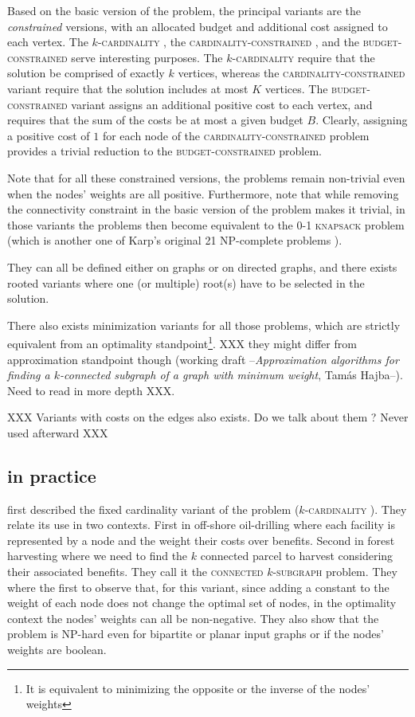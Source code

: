 	Based on the basic version of the \mwcs{} problem, the principal variants are the \emph{constrained} versions, with an allocated budget and additional cost assigned to each vertex.
	The \textsc{$k$-cardinality \mwcs{}}, the \textsc{cardinality-constrained \mwcs{}}, and the \textsc{budget-constrained \mwcs{}} serve interesting purposes.
	The \textsc{$k$-cardinality \mwcs{}} require that the solution be comprised of exactly $k$ vertices, whereas the \textsc{cardinality-constrained \mwcs{}} variant require that the solution includes at most $K$ vertices.
	The \textsc{budget-constrained \mwcs{}} variant assigns an additional positive cost to each vertex, and requires that the sum of the costs be at most a given budget $B$.
	Clearly, assigning a positive cost of $1$ for each node of the \textsc{cardinality-constrained \mwcs{}} problem provides a trivial reduction to the \textsc{budget-constrained \mwcs{}} problem.

	Note that for all these constrained versions, the problems remain non-trivial even when the nodes' weights are all positive.
	Furthermore, note that while removing the connectivity constraint in the basic version of the problem makes it trivial, in those variants the problems then become equivalent to the \textsc{0-1 knapsack} problem (which is another one of Karp's original 21 NP-complete problems \parencite{karp1972reducibility}).

	They can all be defined either on graphs or on directed graphs, and there exists rooted variants where one (or multiple) root(s) have to be selected in the solution.

	There also exists minimization variants for all those problems, which are strictly equivalent from an optimality standpoint\footnote{It is equivalent to minimizing the opposite or the inverse of the nodes' weights}.
	XXX they might differ from approximation standpoint though (working draft --\emph{Approximation algorithms for finding a $k$-connected subgraph of a graph with minimum weight}, Tam\'{a}s Hajba--). Need to read in more depth XXX.

	XXX Variants with costs on the edges also exists. Do we talk about them ? Never used afterward XXX

	\subsection{\mwcs{} in practice}

		\Textcite{hochbaum1994node} first described the fixed cardinality variant of the problem (\textsc{$k$-cardinality \mwcs{}}).
		They relate its use in two contexts.
		First in off-shore oil-drilling where each facility is represented by a node and the weight their costs over benefits.
		Second in forest harvesting where we need to find the $k$ connected parcel to harvest considering their associated benefits.
		They call it the \textsc{connected $k$-subgraph} problem.
		They where the first to observe that, for this variant, since adding a constant to the weight of each node does not change the optimal set of nodes, in the optimality context the nodes' weights can all be non-negative.
		They also show that the problem is NP-hard even for bipartite or planar input graphs or if the nodes' weights are boolean.

